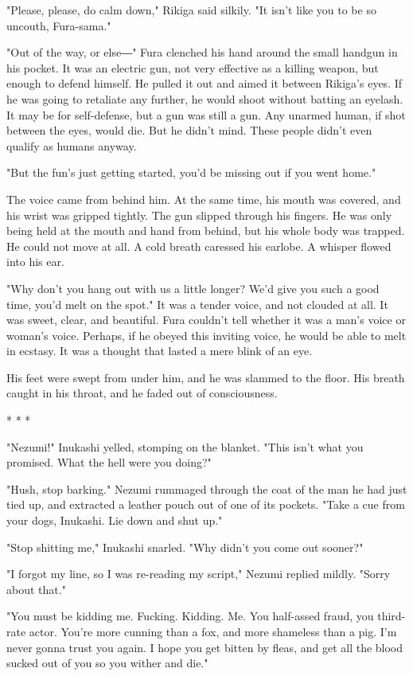 "Please, please, do calm down," Rikiga said silkily. "It isn't like you
to be so uncouth, Fura-sama."

"Out of the way, or else―" Fura clenched his hand around the small
handgun in his pocket. It was an electric gun, not very effective as a
killing weapon, but enough to defend himself. He pulled it out and aimed
it between Rikiga's eyes. If he was going to retaliate any further, he
would shoot without batting an eyelash. It may be for self-defense, but
a gun was still a gun. Any unarmed human, if shot between the eyes,
would die. But he didn't mind. These people didn't even qualify as
humans anyway.

"But the fun's just getting started, you'd be missing out if you went
home."

The voice came from behind him. At the same time, his mouth was covered,
and his wrist was gripped tightly. The gun slipped through his fingers.
He was only being held at the mouth and hand from behind, but his whole
body was trapped. He could not move at all. A cold breath caressed his
earlobe. A whisper flowed into his ear.

"Why don't you hang out with us a little longer? We'd give you such a
good time, you'd melt on the spot." It was a tender voice, and not
clouded at all. It was sweet, clear, and beautiful. Fura couldn't tell
whether it was a man's voice or woman's voice. Perhaps, if he obeyed
this inviting voice, he would be able to melt in ecstasy. It was a
thought that lasted a mere blink of an eye.

His feet were swept from under him, and he was slammed to the floor. His
breath caught in his throat, and he faded out of consciousness.

* * *

"Nezumi!" Inukashi yelled, stomping on the blanket. "This isn't what you
promised. What the hell were you doing?"

"Hush, stop barking." Nezumi rummaged through the coat of the man he had
just tied up, and extracted a leather pouch out of one of its pockets.
"Take a cue from your dogs, Inukashi. Lie down and shut up."

"Stop shitting me," Inukashi snarled. "Why didn't you come out sooner?"

"I forgot my line, so I was re-reading my script," Nezumi replied
mildly. "Sorry about that."~

"You must be kidding me. Fucking. Kidding. Me. You half-assed fraud, you
third-rate actor. You're more cunning than a fox, and more shameless
than a pig. I'm never gonna trust you again. I hope you get bitten by
fleas, and get all the blood sucked out of you so you wither and die."

